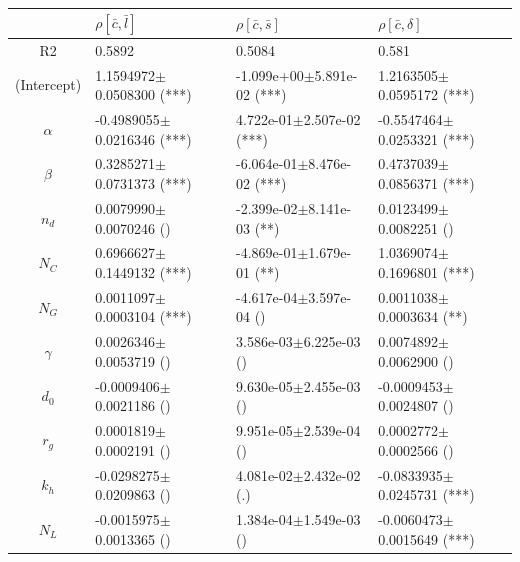\begin{center}
\begin{tabular}{|c|p{3.7cm}|p{3.7cm}|p{3.7cm}|}
 \hline
&$\rho [\bar{c},\bar{l}]$&$\rho [\bar{c},\bar{s}]$&$\rho [\bar{c},\delta]$\\\hline
R2&0.5892&0.5084&0.581\\\hline
(Intercept)&1.1594972$\pm$0.0508300 (***)&-1.099e+00$\pm$5.891e-02 (***)&1.2163505$\pm$0.0595172 (***)\\
$\alpha$&-0.4989055$\pm$0.0216346 (***)&4.722e-01$\pm$2.507e-02 (***)&-0.5547464$\pm$0.0253321 (***)\\
$\beta$&0.3285271$\pm$0.0731373 (***)&-6.064e-01$\pm$8.476e-02 (***)&0.4737039$\pm$0.0856371 (***)\\
$n_d$&0.0079990$\pm$0.0070246 ()&-2.399e-02$\pm$8.141e-03 (**)&0.0123499$\pm$0.0082251 ()\\
$N_C$&0.6966627$\pm$0.1449132 (***)&-4.869e-01$\pm$1.679e-01 (**)&1.0369074$\pm$0.1696801 (***)\\
$N_G$&0.0011097$\pm$0.0003104 (***)&-4.617e-04$\pm$3.597e-04 ()&0.0011038$\pm$0.0003634 (**)\\
$\gamma$&0.0026346$\pm$0.0053719 ()&3.586e-03$\pm$6.225e-03 ()&0.0074892$\pm$0.0062900 ()\\
$d_0$&-0.0009406$\pm$0.0021186 ()&9.630e-05$\pm$2.455e-03 ()&-0.0009453$\pm$0.0024807 ()\\
$r_g$&0.0001819$\pm$0.0002191 ()&9.951e-05$\pm$2.539e-04 ()&0.0002772$\pm$0.0002566 ()\\
$k_h$&-0.0298275$\pm$0.0209863 ()&4.081e-02$\pm$2.432e-02 (.)&-0.0833935$\pm$0.0245731 (***)\\
$N_L$&-0.0015975$\pm$0.0013365 ()&1.384e-04$\pm$1.549e-03 ()&-0.0060473$\pm$0.0015649 (***)\\
 \hline
\end{tabular}

\bigskip


\end{center}

